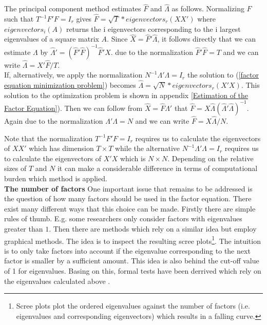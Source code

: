 \documentclass[11pt]{article}
\begin{document}
The principal component method estimates $\hat F$ and $\hat \Lambda$ as follows. Normalizing $F$ such that $T^{-1}F'F = I_r$ gives $\hat F = \sqrt{T} * eigenvectors_r(XX')$ where $eigenvectors_i(A)$ returns the i eigenvectors corresponding to the i largest eigenvalues of a square matrix $A$. Since $\hat X = \hat F' \hat \Lambda$, it follows directly that we can estimate $\Lambda$ by $\hat \Lambda' = (\hat F' \hat F)^{-1} \hat F'X$. due to the normalization $\hat F' \hat F = T$ and we can write $\hat \Lambda = X' \hat F / T$. \\
If, alternatively, we apply the normalization $N^{-1}\Lambda'\Lambda = I_r$ the solution to (\ref{factor equation minimization problem}) becomes $\hat \Lambda = \sqrt{N} * eigenvectors_r(X'X)$. This solution to the optimization problem is shown in appendix \ref{Estimation of the Factor Equation}). Then we can follow from $\hat X = \hat F \hat \Lambda'$ that $\hat F = X \hat \Lambda (\hat \Lambda' \hat \Lambda)^{-1}$. Again due to the normalization $\Lambda' \Lambda = N$ and we can write $\hat F = X \hat \Lambda / N$.

Note that the normalization $T^{-1}F'F = I_r$ requires us to calculate the eigenvectors of $XX'$ which has dimension $T \times T$ while the alternative $N^{-1}\Lambda'\Lambda = I_r$ requires us to calculate the eigenvectors of $X'X$ which is $N \times N$. Depending on the relative sizes of $T$ and $N$ it can make a considerable difference in terms of computational burden which method is applied. \\

\textbf{The number of factors}
One important issue that remains to be addressed is the question of how many factors should be used in the factor equation. There exist many different ways that this choice can be made. Firstly there are simple rules of thumb. E.g. some researchers only consider factors with eigenvalues greater than $1$. Then there are methods which rely on a similar idea but employ graphical methods. The idea is to inspect the resulting scree plots\footnote{Scree plots plot the ordered eigenvalues against the number of factors (i.e. eigenvalues and corresponding eigenvectors) which results in a falling curve.}. The intuition is to only take factors into account if the eigenvalue corresponding to the next factor is smaller by a sufficient amount. This idea is also behind the cut-off value of 1 for eigenvalues. Basing on this, formal tests have been derrived which rely on the eigenvalues calculated above \citep{stock2011dynamic}.
\end{document}
